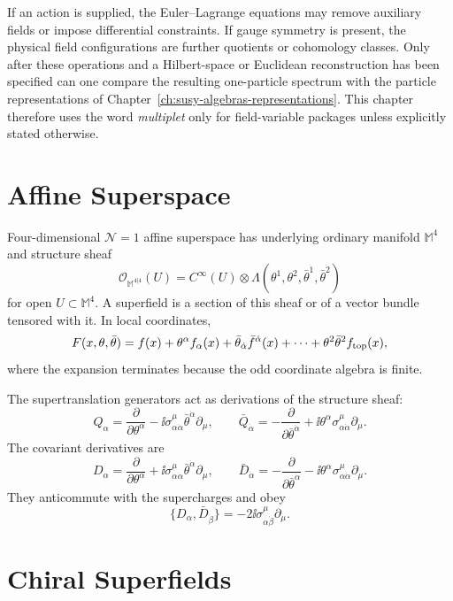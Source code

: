 If an action is supplied, the Euler--Lagrange equations may remove auxiliary
fields or impose differential constraints.  If gauge symmetry is present, the
physical field configurations are further quotients or cohomology classes.
Only after these operations and a Hilbert-space or Euclidean reconstruction
has been specified can one compare the resulting one-particle spectrum with
the particle representations of
Chapter~\ref{ch:susy-algebras-representations}.  This chapter therefore uses
the word \emph{multiplet} only for field-variable packages unless explicitly
stated otherwise.

\section{Affine Superspace}

Four-dimensional \(\mathcal N=1\) affine superspace has underlying ordinary
manifold \(\mathbb M^4\) and structure sheaf
\[
  \mathcal O_{\mathbb M^{4|4}}(U)
  =
  C^\infty(U)\otimes
  \Lambda(\theta^1,\theta^2,\bar\theta^{\dot1},\bar\theta^{\dot2})
\]
for open \(U\subset\mathbb M^4\).  A superfield is a section of this sheaf
or of a vector bundle tensored with it.  In local coordinates,
\[
  F(x,\theta,\bar\theta)
  =
  f(x)+\theta^\alpha f_\alpha(x)
  +\bar\theta_{\dot\alpha}\bar f^{\dot\alpha}(x)
  +\cdots+\theta^2\bar\theta^2 f_{\rm top}(x),
\]
where the expansion terminates because the odd coordinate algebra is finite.

The supertranslation generators act as derivations of the structure sheaf:
\[
  Q_\alpha
  =
  \frac{\partial}{\partial\theta^\alpha}
  -\ii\sigma^\mu_{\alpha\dot\alpha}\bar\theta^{\dot\alpha}\partial_\mu,
  \qquad
  \bar Q_{\dot\alpha}
  =
  -\frac{\partial}{\partial\bar\theta^{\dot\alpha}}
  +\ii\theta^\alpha\sigma^\mu_{\alpha\dot\alpha}\partial_\mu .
\]
The covariant derivatives are
\[
  D_\alpha
  =
  \frac{\partial}{\partial\theta^\alpha}
  +\ii\sigma^\mu_{\alpha\dot\alpha}\bar\theta^{\dot\alpha}\partial_\mu,
  \qquad
  \bar D_{\dot\alpha}
  =
  -\frac{\partial}{\partial\bar\theta^{\dot\alpha}}
  -\ii\theta^\alpha\sigma^\mu_{\alpha\dot\alpha}\partial_\mu .
\]
They anticommute with the supercharges and obey
\[
  \{D_\alpha,\bar D_{\dot\beta}\}
  =
  -2\ii\sigma^\mu_{\alpha\dot\beta}\partial_\mu .
\]

\section{Chiral Superfields}

